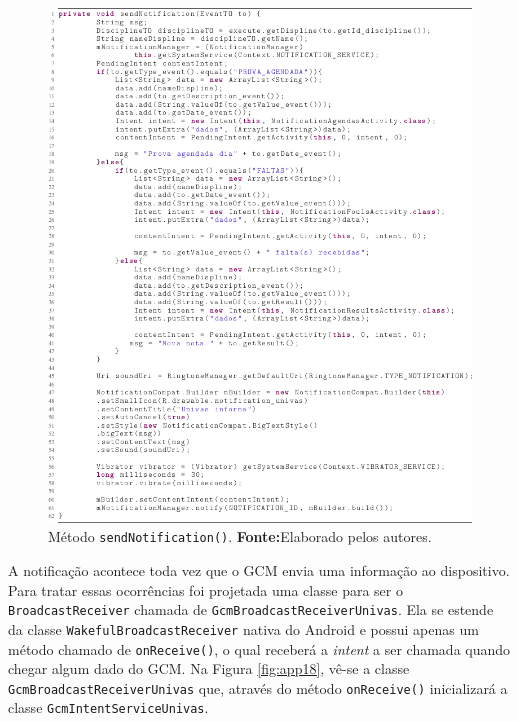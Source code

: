 	\begin{figure}[h!] 
		
		\centerline{\includegraphics[scale=.80]{./imagens/2_q_metodologico/4_procedimentos_resultados/42_aplicativo/send1.png}}
		\caption[Método sendNotification()]{ Método \texttt{sendNotification()}.
		\textbf{Fonte:}Elaborado pelos autores.}
		\label{fig:app17}
	\end{figure}
	
	\pagebreak
	
	\par A notificação acontece toda vez que o GCM envia uma informação ao
dispositivo. Para tratar essas ocorrências foi projetada uma classe para ser o
\texttt{BroadcastReceiver} chamada de \texttt{GcmBroadcastReceiverUnivas}. Ela
se estende da classe \texttt{WakefulBroadcastReceiver} nativa do Android e
possui apenas um método chamado de \texttt{onReceive()}, o qual receberá a
\textit{intent} a ser chamada quando chegar algum dado do GCM. Na Figura
\ref{fig:app18}, vê-se a classe \texttt{GcmBroadcastReceiverUnivas} que,
através do método \texttt{onReceive()} inicializará a classe
\texttt{GcmIntentServiceUnivas}.

